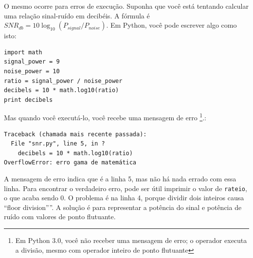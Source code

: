 {%


O mesmo ocorre para erros de execução. Suponha que você está tentando
calcular uma relação sinal-ruído em decibéis. A fórmula
é $SNR_{db} = 10 \log_{10} (P_{signal} / P_{noise})$. Em Python,
você pode escrever algo como isto:


\beforeverb
\begin{verbatim}
import math
signal_power = 9
noise_power = 10
ratio = signal_power / noise_power
decibels = 10 * math.log10(ratio)
print decibels
\end{verbatim}
\afterverb
%
Mas quando você executá-lo, você recebe uma mensagem de erro \footnote{Em Python 3.0,
   você não receber uma mensagem de erro; o operador executa a
   divisão, mesmo com operador inteiro de ponto flutuante}.:



\beforeverb
\begin{verbatim}
Traceback (chamada mais recente passada):
  File "snr.py", line 5, in ?
    decibels = 10 * math.log10(ratio)
OverflowError: erro gama de matemática
\end{verbatim}
\afterverb
%

A mensagem de erro indica que é a linha 5, mas não há nada
errado com essa linha. Para encontrar o verdadeiro erro, pode ser
útil imprimir o valor de {\tt rateio}, o que acaba 
sendo 0. O problema é na linha 4, porque dividir dois inteiros
causa ``floor division''''. A solução é para representar a potência do sinal
e potência de ruído com valores de ponto flutuante.

}

